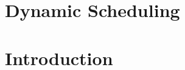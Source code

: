 \documentclass[xcolor=dvipsnames]{beamer}
\begin{document}
\section{Dynamic Scheduling}


\section{Introduction}
\end{document}
